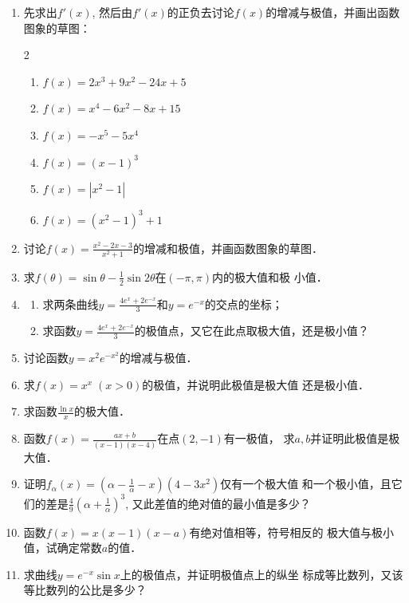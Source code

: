 \begin{ex}
\begin{enumerate}
    \item 先求出$f'(x)$, 然后由$f'(x)$的正负去讨论$f(x)$的增减与极值，并画出函数图象的草图：
\begin{multicols}{2}
    \begin{enumerate}
        \item $f (x) =2x^3+9x^2-24x+5$
        \item $f (x) =x^4-6x^2-8x+15$
        \item $f (x) =-x^5-5x^4$
        \item $f (x) = (x-1)^3$
     \item  $f (x) =|x^2-1|$
     \item $f (x) = (x^2-1)^3+1$
    \end{enumerate}
\end{multicols}
\item 讨论$f(x)=\frac{x^2-2x-3}{x^2+1}$的增减和极值，并画函数图象的草图．
    \item 求$f(\theta)=\sin\theta-\frac{1}{2}\sin2\theta$在$(-\pi,\pi)$内的极大值和极
    小值．
    \item 
\begin{enumerate}
    \item 求两条曲线$y=\frac{4e^x+2e^{-x}}{3}$和$y=e^{-x}$的交点的坐标；
    \item 求函数$y=\frac{4e^x+2e^{-x}}{3}$的极值点，又它在此点取极大值，还是极小值？
\end{enumerate}

\item 讨论函数$y=x^2e^{-x^2}$的增减与极值．
\item 求$f(x)=x^x\; (x>0)$的极值，并说明此极值是极大值
还是极小值．
\item 求函数$\frac{\ln x}{x}$的极大值．

\item 函数$f(x)=\frac{ax+b}{(x-1)(x-4)}$在点$(2,-1)$有一极值，
求$a,b$并证明此极值是极大值．
\item 证明$f_\alpha(x)=\left(\alpha-\frac{1}{\alpha}-x\right)(4-3x^2)$仅有一个极大值
和一个极小值，且它们的差是$\frac{4}{9}\left(\alpha+\frac{1}{\alpha}\right)^3$, 又此差值的绝对值的最小值是多少？
\item 函数$f(x)=x(x-1)(x-a)$有绝对值相等，符号相反的
极大值与极小值，试确定常数$a$的值．
\item 求曲线$y=e^{-x}\sin x$上的极值点，并证明极值点上的纵坐
标成等比数列，又该等比数列的公比是多少？  
\end{enumerate} 
\end{ex}



